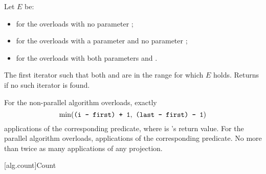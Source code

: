 \begin{itemdescr}
\pnum
Let $E$ be:
\begin{itemize}
\setlength{\emergencystretch}{1em}
\item {} for the overloads with no parameter ;
\item {} for the overloads with a parameter  and no parameter ;
\item {} for the overloads with both parameters  and .
\end{itemize}

\pnum
\returns
The first iterator 
such that both  and  are in the range 
for which $E$ holds.
Returns  if no such iterator is found.

\pnum
\complexity
For the non-parallel algorithm overloads,
exactly \[ \min(\tcode{(i - first) + 1}, \ \tcode{(last - first) - 1}) \]
applications of the corresponding predicate,
where  is 's return value.
For the parallel algorithm overloads,
 applications of the corresponding predicate.
No more than twice as many applications of any projection.
\end{itemdescr}

[alg.count]{Count}

